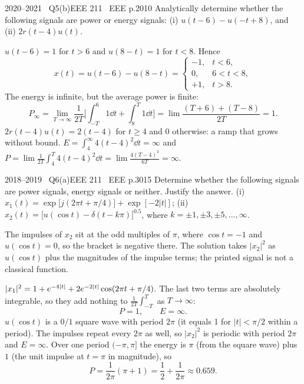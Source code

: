 \begin{qcard}{2020--2021 \textbullet\ Q5(b)}{EEE 211 \textbullet\ EEE p.20}{10}
Analytically determine whether the following signals are power or energy signals: (i) $u(t-6)-u(-t+8)$, and (ii) $2r(t-4)u(t)$.
\end{qcard}
\begin{solution}
 $u(t-6)=1$ for $t>6$ and $u(8-t)=1$ for $t<8$. Hence
\[x(t)=u(t-6)-u(8-t)=\begin{cases}-1,&t<6,\\0,&6<t<8,\\+1,&t>8.\end{cases}\]
The energy is infinite, but the average power is finite:
\[P_\infty=\lim_{T\to\infty}\frac1{2T}\Big[\int_{-T}^{6}1\dd t+\int_8^T1\dd t\Big]=\lim\frac{(T+6)+(T-8)}{2T}=1 .\]
 $2r(t-4)u(t)=2(t-4)$ for $t\ge4$ and $0$ otherwise: a ramp that grows without bound. $E=\int_4^\infty4(t-4)^2\dd t=\infty$ and $P=\lim\frac1{2T}\int_4^T4(t-4)^2\dd t=\lim\frac{4(T-4)^3}{6T}=\infty$.
\end{solution}

\begin{qcard}{2018--2019 \textbullet\ Q6(a)}{EEE 211 \textbullet\ EEE p.30}{15}
Determine whether the following signals are power signals, energy signals or neither. Justify the answer.
(i) $x_1(t)=\exp\!\big[j(2\pi t+\pi/4)\big]+\exp[-2|t|]$;
(ii) $x_2(t)=\big[u(\cos t)-\delta(t-k\pi)\big]^{0.5}$, where $k=\pm1,\pm3,\pm5,\ldots,\infty$.
\end{qcard}
\begin{notebox}The impulses of $x_2$ sit at the odd multiples of $\pi$, where $\cos t=-1$ and $u(\cos t)=0$, so the bracket is negative there. The solution takes $|x_2|^2$ as $u(\cos t)$ plus the magnitudes of the impulse terms; the printed signal is not a classical function.\end{notebox}
\begin{solution}
 $\lvert x_1\rvert^2=1+e^{-4|t|}+2e^{-2|t|}\cos(2\pi t+\pi/4)$. The last two terms are absolutely integrable, so they add nothing to $\frac1{2T}\int_{-T}^{T}$ as $T\to\infty$:
\[P=1,\qquad E=\infty.\]
 $u(\cos t)$ is a $0/1$ square wave with period $2\pi$ (it equals 1 for $|t|<\pi/2$ within a period). The impulses repeat every $2\pi$ as well, so $|x_2|^2$ is periodic with period $2\pi$ and $E=\infty$. Over one period $(-\pi,\pi]$ the energy is $\pi$ (from the square wave) plus $1$ (the unit impulse at $t=\pi$ in magnitude), so
\[P=\frac1{2\pi}(\pi+1)=\frac12+\frac1{2\pi}\approx0.659 .\]
\end{solution}

